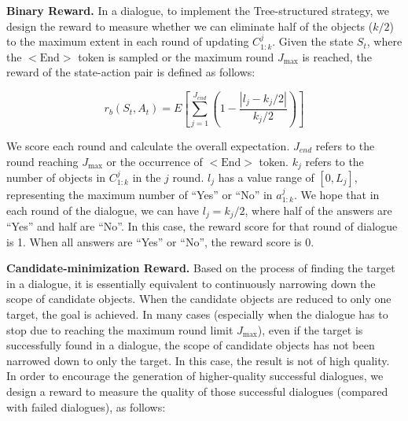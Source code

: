
\textbf{Binary Reward.} In a dialogue, to implement the Tree-structured strategy, we design the reward to measure whether we can eliminate half of the objects ($k/2$) to the maximum extent in each round of updating $C_{1:k}^{j}$. Given the state $S_t$, where the $<\mathrm{End}>$ token is sampled or the maximum round $J_{\max}$ is reached, the reward of the state-action pair is defined as follows:

\setlength{\abovedisplayskip}{3pt}
\begin{small}
\begin{equation}
r_b\left( S_t,A_t \right) =E\left[ \sum_{j=1}^{J_{end}}{\left( 1-\frac{|l_j-k_j/2|}{k_j/2} \right)} \right] 
\end{equation}
\end{small}
We score each round and calculate the overall expectation. $J_{end}$ refers to the round reaching $J_{\max}$ or the occurrence of $<\mathrm{End}>$ token. $k_j$ refers to the number of objects in $C_{1:k}^{j}$ in the $j$ round. $l_j$ has a value range of $\left[ 0,L_j \right] $, representing the maximum number of ``Yes'' or ``No'' in $a_{1:k}^{j}$. We hope that in each round of the dialogue, we can have $l_j=k_j/2$, where half of the answers are ``Yes'' and half are ``No''. In this case, the reward score for that round of dialogue is 1. When all answers are ``Yes'' or ``No'', the reward score is 0. 

\textbf{Candidate-minimization Reward.} Based on the process of finding the target in a dialogue, it is essentially equivalent to continuously narrowing down the scope of candidate objects. When the candidate objects are reduced to only one target, the goal is achieved. In many cases (especially when the dialogue has to stop due to reaching the maximum round limit $J_{\max}$), even if the target is successfully found in a dialogue, the scope of candidate objects has not been narrowed down to only the target. In this case, the result is not of high quality. In order to encourage the generation of higher-quality successful dialogues, we design a reward to measure the quality of those successful dialogues (compared with failed dialogues), as follows:

